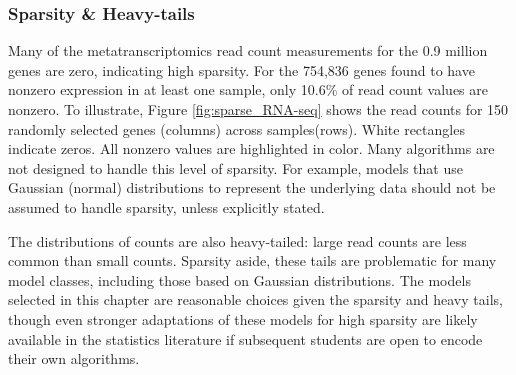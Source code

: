 \subsubsection{Sparsity \& Heavy-tails}
Many of the metatranscriptomics read count measurements for the 0.9 million genes are zero, indicating high sparsity.
For the 754,836 genes found to have nonzero expression in at least one sample, only 10.6\% of read count values are nonzero.
To illustrate, Figure \ref{fig:sparse_RNA-seq} shows the read counts for 150 randomly selected genes (columns) across samples(rows).
White rectangles indicate zeros.  All nonzero values are highlighted in color.
Many algorithms are not designed to handle this level of sparsity.
For example, models that use Gaussian (normal) distributions to represent the underlying data should not be assumed to handle sparsity, unless explicitly stated.

The distributions of counts are also heavy-tailed: large read counts are less common than small counts.
Sparsity aside, these tails are problematic for many model classes, including those based on Gaussian distributions.
The models selected in this chapter are reasonable choices given the sparsity and heavy tails, though even stronger adaptations of these models for high sparsity are likely available in the statistics literature if subsequent students are open to encode their own algorithms.



